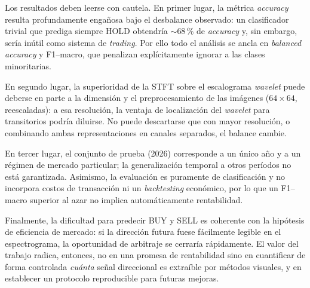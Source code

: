 \documentclass[conference]{IEEEtran}
\begin{document}
Los resultados deben leerse con cautela. En primer lugar, la métrica
\emph{accuracy} resulta profundamente engañosa bajo el desbalance observado:
un clasificador trivial que prediga siempre HOLD obtendría $\sim$68\,\% de
\emph{accuracy} y, sin embargo, sería inútil como sistema de \emph{trading}.
Por ello todo el análisis se ancla en \emph{balanced accuracy} y F1--macro,
que penalizan explícitamente ignorar a las clases minoritarias.

En segundo lugar, la superioridad de la STFT sobre el escalograma
\emph{wavelet} puede deberse en parte a la dimensión y el preprocesamiento
de las imágenes ($64\times64$, reescaladas): a esa resolución, la ventaja de
localización del \emph{wavelet} para transitorios podría diluirse. No puede
descartarse que con mayor resolución, o combinando ambas representaciones en
canales separados, el balance cambie.

En tercer lugar, el conjunto de prueba (2026) corresponde a un único año y a
un régimen de mercado particular; la generalización temporal a otros
períodos no está garantizada. Asimismo, la evaluación es puramente de
clasificación y no incorpora costos de transacción ni un \emph{backtesting}
económico, por lo que un F1--macro superior al azar no implica
automáticamente rentabilidad.

Finalmente, la dificultad para predecir BUY y SELL es coherente con la
hipótesis de eficiencia de mercado: si la dirección futura fuese fácilmente
legible en el espectrograma, la oportunidad de arbitraje se cerraría
rápidamente. El valor del trabajo radica, entonces, no en una promesa de
rentabilidad sino en cuantificar de forma controlada \emph{cuánta} señal
direccional es extraíble por métodos visuales, y en establecer un protocolo
reproducible para futuras mejoras.

\end{document}

